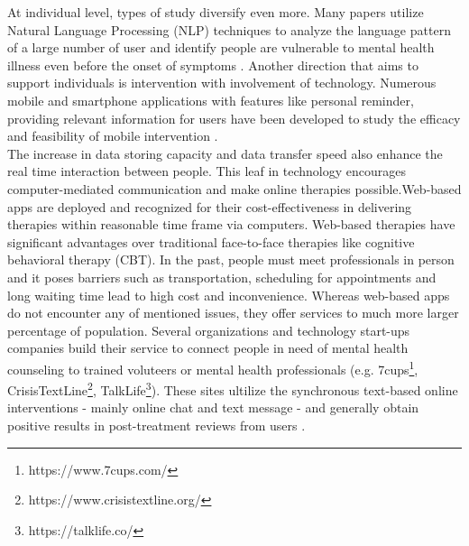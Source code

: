 At individual level, types of study diversify even more. Many papers utilize Natural Language Processing (NLP) techniques to analyze the language pattern of a large number of user and identify people are vulnerable to mental health illness even before the onset of symptoms \cite{Almeida, DeChoudhury2013}. Another direction that aims to support individuals is intervention with involvement of technology. Numerous mobile and smartphone applications with features like personal reminder, providing relevant information for users have been developed to study the efficacy and feasibility of mobile intervention \cite{Rathbone2017}. \\

The increase in data storing capacity and data transfer speed also enhance the real time interaction between people. This leaf in technology encourages computer-mediated communication and make online therapies possible.Web-based apps are deployed and recognized for their cost-effectiveness in delivering therapies within reasonable time frame via computers. Web-based therapies have significant advantages over traditional face-to-face therapies like cognitive behavioral therapy (CBT). In the past, people must meet professionals in person and it poses barriers such as transportation, scheduling for appointments and long waiting time lead to high cost and inconvenience. Whereas web-based apps do not encounter any of mentioned issues, they offer services to much more larger percentage of population. Several organizations and technology start-ups companies build their service to connect people in need of mental health counseling to trained voluteers or mental health professionals (e.g. 7cups\footnote{https://www.7cups.com/}, CrisisTextLine\footnote{https://www.crisistextline.org/}, TalkLife\footnote{https://talklife.co/}). These sites ultilize the synchronous text-based online interventions - mainly online chat and text message - and generally obtain positive results in post-treatment reviews from users \cite{Hoermann2017}.\\

